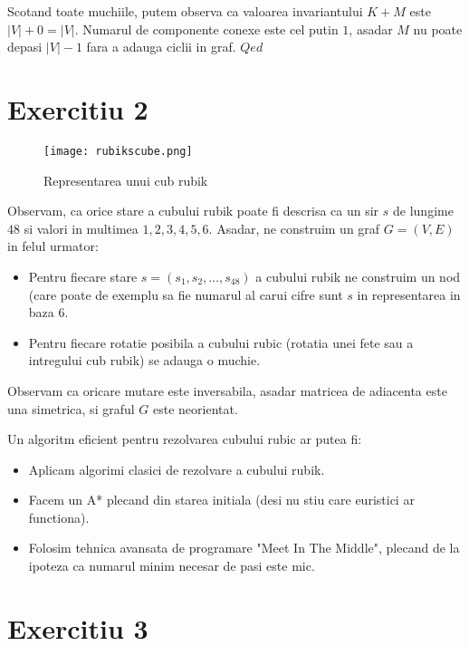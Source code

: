 \documentclass{article}
\begin{document}
Scotand toate muchiile, putem observa ca valoarea invariantului $K + M$ este $|V| + 0 = |V|$.
\newline
Numarul de componente conexe este cel putin $1$, asadar $M$ nu poate depasi $|V| - 1$ fara a adauga ciclii in graf. $Qed$


\section*{Exercitiu 2}

\begin{figure}
    \centering
    \texttt{[image: rubikscube.png]}
    \caption{Representarea unui cub rubik}
\end{figure}

Observam, ca orice stare a cubului rubik poate fi descrisa ca un sir $s$ de lungime $48$ si valori in multimea ${1, 2, 3, 4, 5, 6}$.
\newline
Asadar, ne construim un graf $G = (V, E)$ in felul urmator:
\begin{itemize}
    \item Pentru fiecare stare $s=(s_1, s_2, \dots, s_48)$ a cubului rubik ne construim un nod (care poate de exemplu sa fie numarul al carui cifre sunt $s$ in representarea in baza $6$.
    \item Pentru fiecare rotatie posibila a cubului rubic (rotatia unei fete sau a intregului cub rubik) se adauga o muchie.
\end{itemize}

Observam ca oricare mutare este inversabila, asadar matricea de adiacenta este una simetrica, si graful $G$ este neorientat.

Un algoritm eficient pentru rezolvarea cubului rubic ar putea fi:
\begin{itemize}
    \item Aplicam algorimi clasici de rezolvare a cubului rubik.
    \item Facem un A* plecand din starea initiala (desi nu stiu care euristici ar functiona).
    \item Folosim tehnica avansata de programare "Meet In The Middle", plecand de la ipoteza ca numarul minim necesar de pasi este mic.
\end{itemize}

\section*{Exercitiu 3}
\end{document}
